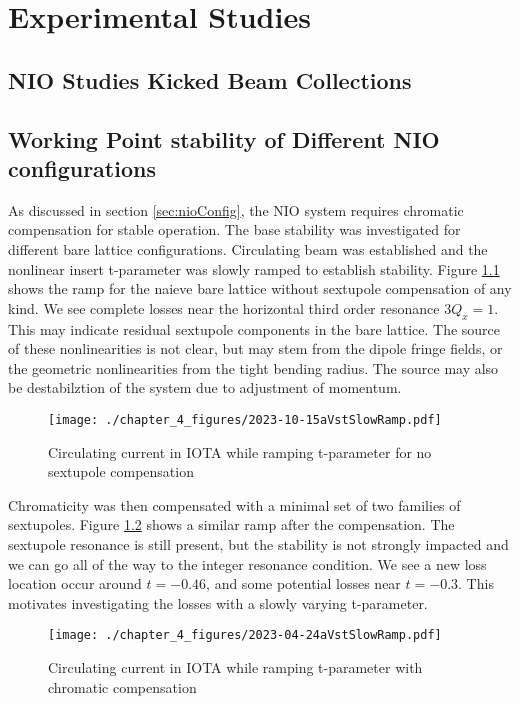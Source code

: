 \chapter{Experimental Studies} \label{chap:expResults}

\section{NIO Studies Kicked Beam Collections}


\section{Working Point stability of Different NIO configurations} \label{sec:nioWorkPoint}
As discussed in section \ref{sec:nioConfig}, the NIO system requires chromatic compensation for stable operation. The base stability was investigated for different bare lattice configurations. Circulating beam was established and the nonlinear insert t-parameter was slowly ramped to establish stability. Figure \ref{fig:bareRamp} shows the ramp for the naieve bare lattice without sextupole compensation of any kind. We see complete losses near the horizontal third order resonance $3 Q_x = 1$. This may indicate residual sextupole components in the bare lattice. The source of these nonlinearities is not clear, but may stem from the dipole fringe fields, or the geometric nonlinearities from the tight bending radius. The source may also be destabilztion of the system due to adjustment of momentum.

\begin{figure}
	\centering
	\texttt{[image: ./chapter\_4\_figures/2023-10-15aVstSlowRamp.pdf]}
	\caption{Circulating current in IOTA while ramping t-parameter for no sextupole compensation}
	\label{fig:bareRamp}
\end{figure}


Chromaticity was then compensated with a minimal set of two families of sextupoles. Figure \ref{fig:midRamp} shows a similar ramp after the compensation. The sextupole resonance is still present, but the stability is not strongly impacted and we can go all of the way to the integer resonance condition. We see a new loss location occur around $t=-0.46$, and some potential losses near $t=-0.3$. This motivates investigating the losses with a slowly varying t-parameter.

\begin{figure}
	\centering
	\texttt{[image: ./chapter\_4\_figures/2023-04-24aVstSlowRamp.pdf]}
	\caption{Circulating current in IOTA while ramping t-parameter with chromatic compensation}
	\label{fig:midRamp}
\end{figure}



